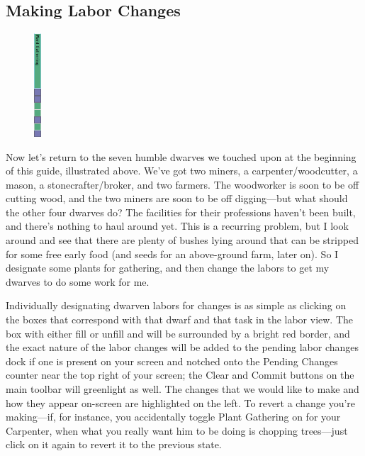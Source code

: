 \documentclass[]{article}
\begin{document}
\vfill
\subsection{Making Labor Changes}
\label{sec:Making Labor Changes}
\begin{figure}
\vspace{-22pt}
  \begin{center}
    \includegraphics[width=0.023\textwidth]{Sec2Fig2-1}
  \end{center}
\vspace{-10pt}
\end{figure}
Now let's return to the seven humble dwarves we touched upon at the beginning of this guide, illustrated
above. We've got two miners, a carpenter/woodcutter, a mason, a stonecrafter/broker, and two farmers. The
woodworker is soon to be off cutting wood, and the two miners are soon to be off digging---but what
should the other four dwarves do? The facilities for their professions haven't been built, and there's
nothing to haul around yet. This is a recurring problem, but I look around and see that there are plenty
of bushes lying around that can be stripped for some free early food (and seeds for an above-ground farm,
later on). So I designate some plants for gathering, and then change the labors to get my dwarves to do
some work for me.

Individually designating dwarven labors for changes is as simple as clicking on the boxes that correspond
with that dwarf and that task in the labor view. The box with either fill or unfill and will be
surrounded by a bright red border, and the exact nature of the labor changes will be added to the pending
labor changes dock if one is present on your screen and notched onto the Pending Changes counter near the
top right of your screen; the Clear and Commit buttons on the main toolbar will greenlight as well. The
changes that we would like to make and how they appear on-screen are highlighted on the left. To revert a
change you're making---if, for instance, you accidentally toggle Plant Gathering on for your Carpenter,
when what you really want him to be doing is chopping trees---just click on it again to revert it to the
previous state.
\end{document}
